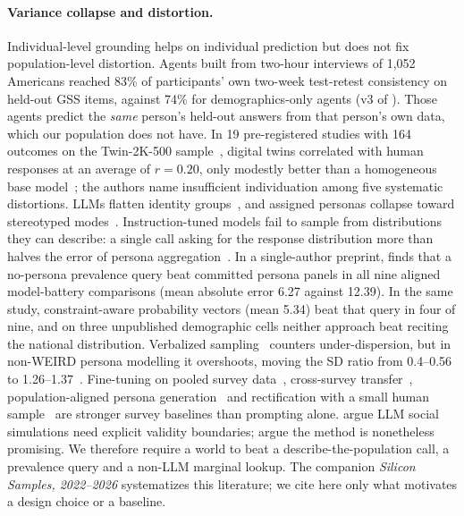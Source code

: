 \documentclass[11pt]{article}
\begin{document}
\paragraph{Variance collapse and distortion.} Individual-level grounding helps on individual prediction but does not fix population-level distortion. Agents built from two-hour interviews of 1,052 Americans reached 83\% of participants' own two-week test-retest consistency on held-out GSS items, against 74\% for demographics-only agents (v3 of \citet{park2024grounded}). Those agents predict the \emph{same} person's held-out answers from that person's own data, which our population does not have. In 19 pre-registered studies with 164 outcomes on the Twin-2K-500 sample~\citep{toubia2025twin}, digital twins correlated with human responses at an average of $r=0.20$, only modestly better than a homogeneous base model~\citep{peng2025funhouse}; the authors name insufficient individuation among five systematic distortions. LLMs flatten identity groups~\citep{wang2024misportray}, and assigned personas collapse toward stereotyped modes~\citep{xiao2026chameleon}. Instruction-tuned models fail to sample from distributions they can describe: a single call asking for the response distribution more than halves the error of persona aggregation~\citep{jang2026instruction}. In a single-author preprint, \citet{doudkin2026marginal} finds that a no-persona prevalence query beat committed persona panels in all nine aligned model-battery comparisons (mean absolute error 6.27 against 12.39). In the same study, constraint-aware probability vectors (mean 5.34) beat that query in four of nine, and on three unpublished demographic cells neither approach beat reciting the national distribution. Verbalized sampling~\citep{zhang2025verbalized} counters under-dispersion, but in non-WEIRD persona modelling it overshoots, moving the SD ratio from 0.4--0.56 to 1.26--1.37~\citep{ozkan2026distribution}. Fine-tuning on pooled survey data~\citep{suh2025subpop}, cross-survey transfer~\citep{ku2026cross}, population-aligned persona generation~\citep{hu2025population} and rectification with a small human sample~\citep{krsteski2025valid,angelopoulos2023ppi} are stronger survey baselines than prompting alone. \citet{wu2025boundary} argue LLM social simulations need explicit validity boundaries; \citet{anthis2025promising} argue the method is nonetheless promising. We therefore require a world to beat a describe-the-population call, a prevalence query and a non-LLM marginal lookup. The companion \emph{Silicon Samples, 2022--2026} systematizes this literature; we cite here only what motivates a design choice or a baseline.
\end{document}
